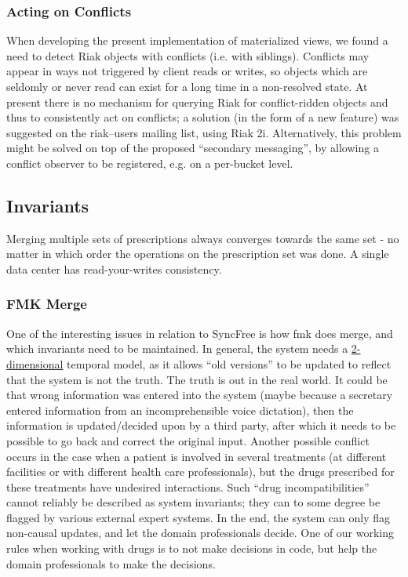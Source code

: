 \documentclass[11pt,a4paper]{report}
\begin{document}
\subsubsection{Acting on Conflicts}
When developing the present implementation of materialized views, we found a need to detect Riak objects with conflicts (i.e. with siblings). Conflicts may appear in ways not triggered by client reads or writes, so objects which are seldomly or never read can exist for a long time in a non-resolved state. At present there is no mechanism for querying Riak for conflict-ridden objects and thus to consistently act on conflicts; a solution (in the form of a new feature) was suggested on the riak--users mailing list, using Riak 2i.
Alternatively, this problem might be solved on top of the proposed ``secondary messaging'', by allowing a conflict observer to be registered, e.g. on a per-bucket level.

\subsection{Invariants}
Merging multiple sets of prescriptions always converges towards the same set - no matter in which order the operations on the prescription set was done.
A single data center has read-your-writes consistency.

\subsubsection{FMK Merge}
One of the interesting issues in relation to SyncFree is how \gls{fmk} does merge, and which invariants need to be maintained.
In general, the system needs a \href{http://en.wikipedia.org/wiki/Bitemporal_data}{2-dimensional} temporal model, as it allows ``old versions'' to be updated to reflect that the system is not the truth. The truth is out in the real world. It could be that wrong information was entered into the system (maybe because a secretary entered information from an incomprehensible voice dictation), then the information is updated/decided upon by a third party, after which it needs to be possible to go back and correct the original input. Another possible conflict occurs in the case when a patient is involved in several treatments (at different facilities or with different health care professionals), but the drugs prescribed for these treatments have undesired interactions. Such ``drug incompatibilities'' cannot reliably be described as system invariants; they can to some degree be flagged by various external expert systems. In the end, the system can only flag non-causal updates, and let the domain professionals decide. One of our working rules when working with drugs is to not make decisions in code, but help the domain professionals to make the decisions.
\end{document}
